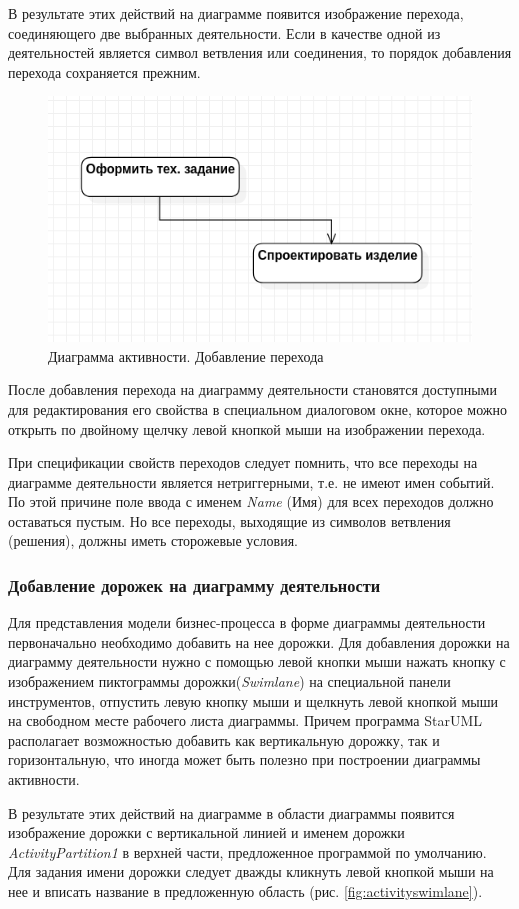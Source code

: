 \documentclass[a4paper,12pt]{report}
\newcommand{\staruml}{StarUML\,\tm}
\begin{document}
В результате этих действий на диаграмме появится изображение перехода, соединяющего две выбранных деятельности. Если в качестве одной из деятельностей является символ ветвления или соединения, то порядок добавления перехода сохраняется прежним.
\begin{figure}[h!]
	\centering
	\includegraphics[width=0.6\linewidth]{images/activityflow}
	\caption{Диаграмма активности. Добавление перехода}
	\label{fig:activityflow}
\end{figure}

После добавления перехода на диаграмму деятельности становятся доступными для редактирования его свойства в специальном диалоговом окне, которое можно открыть по двойному щелчку левой кнопкой мыши на изображении перехода.

При спецификации свойств переходов следует помнить, что все переходы на диаграмме деятельности является нетриггерными, т.е. не имеют имен событий. По этой причине поле ввода с именем \textit{Name} (Имя) для всех переходов должно оставаться пустым. Но все переходы, выходящие из символов ветвления (решения), должны иметь сторожевые условия.
\subsubsection*{Добавление дорожек на диаграмму деятельности}	
Для представления модели бизнес-процесса в форме диаграммы деятельности первоначально необходимо добавить на нее дорожки. Для добавления дорожки на диаграмму деятельности нужно с помощью левой кнопки мыши нажать кнопку с изображением пиктограммы дорожки(\textit{Swimlane}) на специальной панели инструментов, отпустить левую кнопку мыши и щелкнуть левой кнопкой мыши на свободном месте рабочего листа диаграммы. Причем программа \staruml располагает возможностью добавить как вертикальную дорожку, так и горизонтальную, что иногда может быть полезно при построении диаграммы активности.

В результате этих действий на диаграмме в области диаграммы появится изображение дорожки с вертикальной линией и именем дорожки \textit{ActivityPartition1} в верхней части, предложенное программой по умолчанию. Для задания имени дорожки следует дважды кликнуть левой кнопкой мыши на нее и вписать название в предложенную область (рис. \ref{fig:activityswimlane}).
\end{document}
